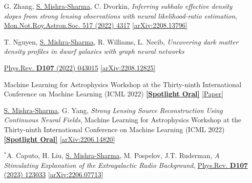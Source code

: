 \documentclass[letterpaper,11pt]{article}
\newenvironment{packed_itemize}{
\begin{itemize}[label=\raisebox{0.25ex}{\tiny$\bullet$}]
  \setlength{\itemsep}{4.2pt}
  \setlength{\parskip}{0pt}
  \setlength{\parsep}{0pt}}{\end{itemize}
}
\newenvironment{packed_enumerate}[1][]{
\begin{etaremune}[#1]
  \setlength{\itemsep}{3.7pt}
  \setlength{\parskip}{0pt}
  \setlength{\parsep}{0pt}}{\end{etaremune}
}
\begin{document}
\begin{packed_enumerate}[start=38]
  \item G. Zhang, \underline{S. Mishra-Sharma}, C. Dvorkin, \emph{Inferring subhalo effective density slopes from strong lensing observations with neural likelihood-ratio estimation}, \href{https://doi.org/10.1093/mnras/stac3014}{Mon.Not.Roy.Astron.Soc. 517 (2022) 4317} \href{https://arxiv.org/abs/2208.13796}{[arXiv:2208.13796]}

  \item T. Nguyen, \underline{S. Mishra-Sharma}, R. Williams, L. Necib, \emph{Uncovering dark matter density profiles in dwarf galaxies with graph neural networks}
  \begin{packed_itemize}
      \item {\href{https://journals.aps.org/prd/abstract/10.1103/PhysRevD.107.043015}{Phys.Rev. \textbf{D107} (2022) 043015}} \href{https://arxiv.org/abs/2208.12825}{[arXiv:2208.12825]}
      \item Machine Learning for Astrophysics Workshop at the Thirty-ninth International Conference on Machine Learning (ICML 2022) \href{https://ml4astro.github.io/icml2022/}{\textbf{[Spotlight Oral]}} \href{https://ml4astro.github.io/icml2022/assets/38.pdf}{[Paper]}
    \end{packed_itemize}
    
  \item \underline{S. Mishra-Sharma}, G. Yang, \emph{Strong Lensing Source Reconstruction Using Continuous Neural Fields}, {Machine Learning for Astrophysics Workshop at the Thirty-ninth International Conference on Machine Learning (ICML 2022)} \href{https://ml4astro.github.io/icml2022/}{\textbf{[Spotlight Oral]}} \href{https://arxiv.org/abs/2206.14820}{[arXiv:2206.14820]}
   

  \item $^*$A. Caputo, H. Liu, \underline{S. Mishra-Sharma}, M. Pospelov, J.T. Ruderman, \emph{A Stimulating Explanation of the Extragalactic Radio Background}, \href{https://journals.aps.org/prd/abstract/10.1103/PhysRevD.107.123033}{Phys.Rev. \textbf{D107} (2023) 123033} \href{https://arxiv.org/abs/2206.07713}{[arXiv:2206.07713]}


\end{packed_enumerate}
\end{document}
